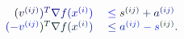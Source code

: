 \documentclass[12pt]{article}
\begin{document}
\makeatletter
\renewcommand*{\@textcolor}[3]{%
  \protect\leavevmode
  \begingroup
    \color#1{#2}#3%
  \endgroup
}
\makeatother
\begin{displaymath}
\begin{array} {rl} { \mathcolor[RGB]{0,0,15}{(} \mathcolor[RGB]{0,0,30}{v} ^ { \mathcolor[RGB]{0,0,45}{(} \mathcolor[RGB]{0,0,60}{i} \mathcolor[RGB]{0,0,75}{j} \mathcolor[RGB]{0,0,90}{)} } \mathcolor[RGB]{0,0,105}{)} ^ { \mathcolor[RGB]{0,0,120}{T} } \mathcolor[RGB]{0,0,135}{\nabla} \mathcolor[RGB]{0,0,150}{f} \mathcolor[RGB]{0,0,165}{(} \mathcolor[RGB]{0,0,180}{x} ^ { \mathcolor[RGB]{0,0,195}{(} \mathcolor[RGB]{0,0,210}{i} \mathcolor[RGB]{0,0,225}{)} } \mathcolor[RGB]{0,0,240}{)} } & { { } \mathcolor[RGB]{0,0,255}{\leq} \mathcolor[RGB]{0,15,0}{s} ^ { \mathcolor[RGB]{0,15,15}{(} \mathcolor[RGB]{0,15,30}{i} \mathcolor[RGB]{0,15,45}{j} \mathcolor[RGB]{0,15,60}{)} } \mathcolor[RGB]{0,15,75}{+} \mathcolor[RGB]{0,15,90}{a} ^ { \mathcolor[RGB]{0,15,105}{(} \mathcolor[RGB]{0,15,120}{i} \mathcolor[RGB]{0,15,135}{j} \mathcolor[RGB]{0,15,150}{)} } } \\ { \mathcolor[RGB]{0,15,165}{(} \mathcolor[RGB]{0,15,180}{-} \mathcolor[RGB]{0,15,195}{v} ^ { \mathcolor[RGB]{0,15,210}{(} \mathcolor[RGB]{0,15,225}{i} \mathcolor[RGB]{0,15,240}{j} \mathcolor[RGB]{0,15,255}{)} } \mathcolor[RGB]{0,30,0}{)} ^ { \mathcolor[RGB]{0,30,15}{T} } \mathcolor[RGB]{0,30,30}{\nabla} \mathcolor[RGB]{0,30,45}{f} \mathcolor[RGB]{0,30,60}{(} \mathcolor[RGB]{0,30,75}{x} ^ { \mathcolor[RGB]{0,30,90}{(} \mathcolor[RGB]{0,30,105}{i} \mathcolor[RGB]{0,30,120}{)} } \mathcolor[RGB]{0,30,135}{)} } & { { } \mathcolor[RGB]{0,30,150}{\leq} \mathcolor[RGB]{0,30,165}{a} ^ { \mathcolor[RGB]{0,30,180}{(} \mathcolor[RGB]{0,30,195}{i} \mathcolor[RGB]{0,30,210}{j} \mathcolor[RGB]{0,30,225}{)} } \mathcolor[RGB]{0,30,240}{-} \mathcolor[RGB]{0,30,255}{s} ^ { \mathcolor[RGB]{0,45,0}{(} \mathcolor[RGB]{0,45,15}{i} \mathcolor[RGB]{0,45,30}{j} \mathcolor[RGB]{0,45,45}{)} } \mathcolor[RGB]{0,45,60}{.} } \end{array}
\end{displaymath}
\end{document}
